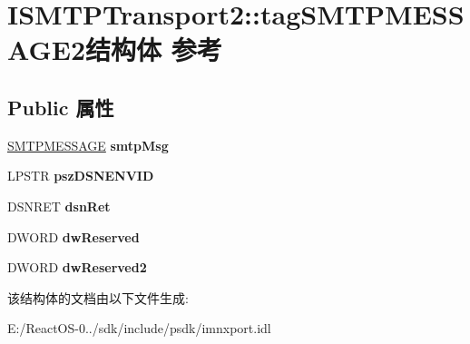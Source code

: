 \hypertarget{struct_i_s_m_t_p_transport2_1_1tag_s_m_t_p_m_e_s_s_a_g_e2}{}\section{I\+S\+M\+T\+P\+Transport2\+:\+:tag\+S\+M\+T\+P\+M\+E\+S\+S\+A\+G\+E2结构体 参考}
\label{struct_i_s_m_t_p_transport2_1_1tag_s_m_t_p_m_e_s_s_a_g_e2}
\subsection*{Public 属性}
\begin{DoxyCompactItemize}
\item 
\mbox{\label{struct_i_s_m_t_p_transport2_1_1tag_s_m_t_p_m_e_s_s_a_g_e2_a1e4a622901938df04a4671a810fbe526}} 
\hyperlink{struct_i_s_m_t_p_transport_1_1tag_s_m_t_p_m_e_s_s_a_g_e}{S\+M\+T\+P\+M\+E\+S\+S\+A\+GE} {\bfseries smtp\+Msg}
\item 
\mbox{\label{struct_i_s_m_t_p_transport2_1_1tag_s_m_t_p_m_e_s_s_a_g_e2_a46244c3f5e91d111517f9b0a38d44225}} 
L\+P\+S\+TR {\bfseries psz\+D\+S\+N\+E\+N\+V\+ID}
\item 
\mbox{\label{struct_i_s_m_t_p_transport2_1_1tag_s_m_t_p_m_e_s_s_a_g_e2_aaa449a9e33885278b1ca4268d6c55c74}} 
D\+S\+N\+R\+ET {\bfseries dsn\+Ret}
\item 
\mbox{\label{struct_i_s_m_t_p_transport2_1_1tag_s_m_t_p_m_e_s_s_a_g_e2_abce413538ba84e376c5d4c0adc29d4bd}} 
D\+W\+O\+RD {\bfseries dw\+Reserved}
\item 
\mbox{\label{struct_i_s_m_t_p_transport2_1_1tag_s_m_t_p_m_e_s_s_a_g_e2_a1280cee1f3a0c4714137b0321a9d375a}} 
D\+W\+O\+RD {\bfseries dw\+Reserved2}
\end{DoxyCompactItemize}


该结构体的文档由以下文件生成\+:\begin{DoxyCompactItemize}
\item 
E\+:/\+React\+O\+S-\/0../sdk/include/psdk/imnxport.\+idl\end{DoxyCompactItemize}
